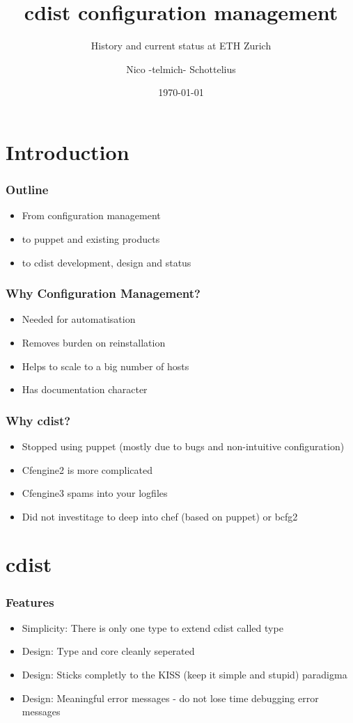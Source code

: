 \documentclass{beamer}
\title{cdist configuration management}
\subtitle{History and current status at ETH Zurich}
\author{Nico -telmich- Schottelius}
\date{\today}
\begin{document}
\frame{\titlepage}
\section[Outline]{}
\frame{\tableofcontents}


\section{Introduction}
\frame
{
  \frametitle{Outline}
   \begin{itemize}
      \item From configuration management
      \item to puppet and existing products
      \item to cdist development, design and status
   \end{itemize}
}

\frame
{
  \frametitle{Why Configuration Management?}
   \begin{itemize}
      \item Needed for automatisation
      \item Removes burden on reinstallation
      \item Helps to scale to a big number of hosts
      \item Has documentation character
   \end{itemize}
}

\frame
{
  \frametitle{Why cdist?}
   \begin{itemize}
      \item Stopped using puppet (mostly due to bugs and non-intuitive configuration)
      \item Cfengine2 is more complicated
      \item Cfengine3 spams into your logfiles
      \item Did not investitage to deep into chef (based on puppet) or bcfg2
   \end{itemize}
}

\section{cdist}
\begin{frame}
   \frametitle{Features}
   \begin{itemize}
\item Simplicity:  There is only one type to extend cdist called type
\item Design:  Type and core cleanly seperated
\item Design:  Sticks completly to the KISS (keep it simple and stupid) paradigma
\item Design:  Meaningful error messages - do not lose time debugging error messages
   \end{itemize}
\end{frame}
\end{document}
